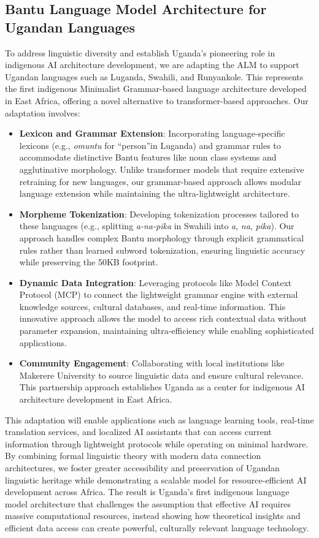 \documentclass[11pt]{article}
\begin{document}
\subsection*{Bantu Language Model Architecture for Ugandan Languages}
To address linguistic diversity and establish Uganda's pioneering role in indigenous AI architecture development, we are adapting the ALM to support Ugandan languages such as Luganda, Swahili, and Runyankole. This represents the first indigenous Minimalist Grammar-based language architecture developed in East Africa, offering a novel alternative to transformer-based approaches. Our adaptation involves:
\begin{itemize}
    \item \textbf{Lexicon and Grammar Extension}: Incorporating language-specific lexicons (e.g., \textit{omuntu} for \textquotedblleft person\textquotedblright in Luganda) and grammar rules to accommodate distinctive Bantu features like noun class systems and agglutinative morphology. Unlike transformer models that require extensive retraining for new languages, our grammar-based approach allows modular language extension while maintaining the ultra-lightweight architecture.
    \item \textbf{Morpheme Tokenization}: Developing tokenization processes tailored to these languages (e.g., splitting \textit{a-na-pika} in Swahili into \textit{a}, \textit{na}, \textit{pika}). Our approach handles complex Bantu morphology through explicit grammatical rules rather than learned subword tokenization, ensuring linguistic accuracy while preserving the 50KB footprint.
    \item \textbf{Dynamic Data Integration}: Leveraging protocols like Model Context Protocol (MCP) to connect the lightweight grammar engine with external knowledge sources, cultural databases, and real-time information. This innovative approach allows the model to access rich contextual data without parameter expansion, maintaining ultra-efficiency while enabling sophisticated applications.
    \item \textbf{Community Engagement}: Collaborating with local institutions like Makerere University to source linguistic data and ensure cultural relevance. This partnership approach establishes Uganda as a center for indigenous AI architecture development in East Africa.
\end{itemize}
This adaptation will enable applications such as language learning tools, real-time translation services, and localized AI assistants that can access current information through lightweight protocols while operating on minimal hardware. By combining formal linguistic theory with modern data connection architectures, we foster greater accessibility and preservation of Ugandan linguistic heritage while demonstrating a scalable model for resource-efficient AI development across Africa. The result is Uganda's first indigenous language model architecture that challenges the assumption that effective AI requires massive computational resources, instead showing how theoretical insights and efficient data access can create powerful, culturally relevant language technology.
\end{document}
